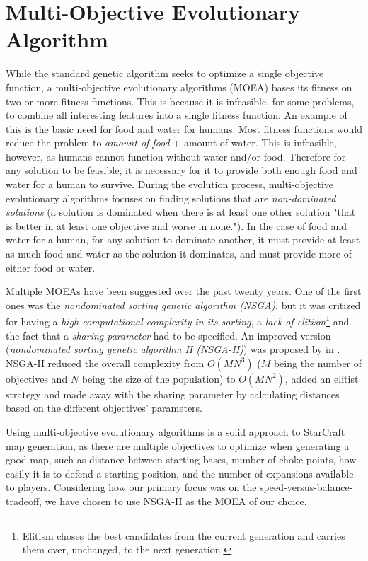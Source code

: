 \section{Multi-Objective Evolutionary Algorithm}
\label{methodology_moea}
While the standard genetic algorithm seeks to optimize a single objective function, a multi-objective evolutionary algorithms (MOEA) bases its fitness on two or more fitness functions. This is because it is infeasible, for some problems, to combine all interesting features into a single fitness function. An example of this is the basic need for food and water for humans. Most fitness functions would reduce the problem to \textit{amount of food} + {amount of water}. This is infeasible, however, as humans cannot function without water and/or food. Therefore for any solution to be feasible, it is necessary for it to provide both enough food and water for a human to survive. During the evolution process, multi-objective evolutionary algorithms focuses on finding solutions that are \textit{non-dominated solutions} (a solution is dominated when there is at least one other solution "that is better in at least one objective and worse in none."\cite{Togelius2013Controllable}). In the case of food and water for a human, for any solution to dominate another, it must provide at least as much food and water as the solution it dominates, and must provide more of either food or water.

Multiple MOEAs have been suggested over the past twenty years\cite{Deb2001Multi, Fonseca1993Genetic, Srinivas1994Muiltiobjective}. One of the first ones was the \textit{nondominated sorting genetic algorithm (NSGA)}\cite{Srinivas1994Muiltiobjective}, but it was critized for having a \textit{high computational complexity in its sorting}, a \textit{lack of elitism}\footnote{Elitism choses the best candidates from the current generation and carries them over, unchanged, to the next generation.} and the fact that a \textit{sharing parameter} had to be specified. An improved version (\textit{nondominated sorting genetic algorithm II (NSGA-II)}) was proposed by \citeauthor{Deb2000Fast}\cite{Deb2000Fast} in \citeyear{Deb2000Fast}. NSGA-II reduced the overall complexity from $O(M N^3)$ ($M$ being the number of objectives and $N$ being the size of the population) to $O(M N^2)$, added an elitist strategy and made away with the sharing parameter by calculating distances based on the different objectives' parameters.

Using multi-objective evolutionary algorithms is a solid approach to StarCraft map generation, as there are multiple objectives to optimize when generating a good map, such as distance between starting bases, number of choke points, how easily it is to defend a starting position, and the number of expansions available to players. Considering how our primary focus was on the speed-versus-balance-tradeoff, we have chosen to use NSGA-II as the MOEA of our choice.